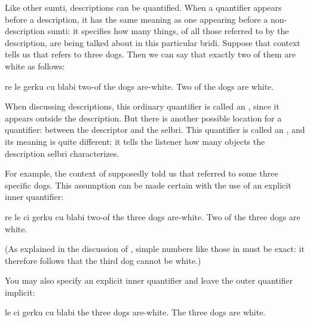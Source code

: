 Like other sumti, descriptions can be quantified. When a
    quantifier appears before a description, it has the same
    meaning as one appearing before a non-description sumti: it
    specifies how many things, of all those referred to by the
    description, are being talked about in this particular bridi.
    Suppose that context tells us that  refers to three
    dogs. Then we can say that exactly two of them are white as
    follows:
\begin{example}
re le gerku cu blabi\n
two-of the dogs are-white.\n
Two of the dogs are white.
\end{example}

When discussing descriptions, this ordinary quantifier is
    called an , since it appears outside the
    description. But there is another possible location for a
    quantifier: between the descriptor and the selbri. This
    quantifier is called an , and its meaning
    is quite different: it tells the listener how many objects the
    description selbri characterizes. 

For example, the context of 
    supposedly told us that  referred to some three
    specific dogs. This assumption can be made certain with the use
    of an explicit inner quantifier:
\begin{example}
re le ci gerku cu blabi\n
two-of the three dogs are-white.\n
Two of the three dogs are white.
\end{example}

(As explained in the discussion of , simple numbers like those in  must be exact: it therefore follows that the third dog
    cannot be white.) 

You may also specify an explicit inner quantifier and leave
    the outer quantifier implicit:
\begin{example}
le ci gerku cu blabi\n
the three dogs are-white.\n
The three dogs are white.
\end{example}


